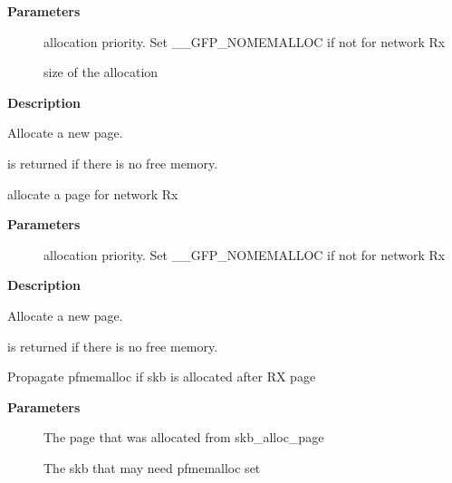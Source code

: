 \documentclass[a4paper,8pt,english]{sphinxmanual}
\begin{document}
\textbf{Parameters}
\begin{description}
\item[{}] \leavevmode
allocation priority. Set \_\_GFP\_NOMEMALLOC if not for network Rx

\item[{}] \leavevmode
size of the allocation

\end{description}

\textbf{Description}

Allocate a new page.

 is returned if there is no free memory.

\begin{fulllineitems}
\label{networking/kapi:c.__dev_alloc_page}
allocate a page for network Rx

\end{fulllineitems}


\textbf{Parameters}
\begin{description}
\item[{}] \leavevmode
allocation priority. Set \_\_GFP\_NOMEMALLOC if not for network Rx

\end{description}

\textbf{Description}

Allocate a new page.

 is returned if there is no free memory.

\begin{fulllineitems}
\label{networking/kapi:c.skb_propagate_pfmemalloc}
Propagate pfmemalloc if skb is allocated after RX page

\end{fulllineitems}


\textbf{Parameters}
\begin{description}
\item[{}] \leavevmode
The page that was allocated from skb\_alloc\_page

\item[{}] \leavevmode
The skb that may need pfmemalloc set

\end{description}
\end{document}
